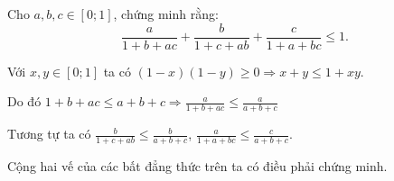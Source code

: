 \begin{problem}
	Cho $a, b, c \in [0; 1]$, chứng minh rằng:
	$$
		\frac{a}{1 + b + ac} + \frac{b}{1 + c + ab} + \frac{c}{1 + a + bc} \le 1.
	$$
	\solution

	Với $x, y \in [0; 1]$ ta có $(1 - x)(1 - y) \ge 0 \Rightarrow x + y \le 1 + xy$.

	Do đó $\displaystyle 1 + b + ac \le a + b + c \Rightarrow \frac{a}{1 + b + ac} \le \frac{a}{a + b + c}$

	Tương tự ta có $\displaystyle \frac{b}{1 + c + ab} \le \frac{b}{a + b + c}$, $ \displaystyle \frac{a}{1 + a + bc} \le \frac{c}{a + b + c}$.
	
	Cộng hai vế của các bất đẳng thức trên ta có điều phải chứng minh.
\end{problem}